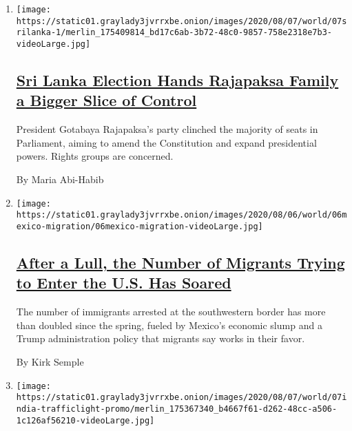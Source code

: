\begin{enumerate}
\def\labelenumi{\arabic{enumi}.}
\item
  \texttt{[image: https://static01.graylady3jvrrxbe.onion/images/2020/08/07/world/07srilanka-1/merlin\_175409814\_bd17c6ab-3b72-48c0-9857-758e2318e7b3-videoLarge.jpg]}

  \hypertarget{sri-lanka-election-hands-rajapaksa-family-a-bigger-slice-of-control}{%
  \subsection{\texorpdfstring{\href{/2020/08/06/world/asia/sri-lanka-elections-rajapaksa.html}{Sri
  Lanka Election Hands Rajapaksa Family a Bigger Slice of
  Control}}{Sri Lanka Election Hands Rajapaksa Family a Bigger Slice of Control}}\label{sri-lanka-election-hands-rajapaksa-family-a-bigger-slice-of-control}}

  President Gotabaya Rajapaksa's party clinched the majority of seats in
  Parliament, aiming to amend the Constitution and expand presidential
  powers. Rights groups are concerned.

  By Maria Abi-Habib
\item
  \texttt{[image: https://static01.graylady3jvrrxbe.onion/images/2020/08/06/world/06mexico-migration/06mexico-migration-videoLarge.jpg]}

  \hypertarget{after-a-lull-the-number-of-migrants-trying-to-enter-the-us-has-soared}{%
  \subsection{\texorpdfstring{\href{/2020/08/06/world/americas/mexico-immigration-usa.html}{After
  a Lull, the Number of Migrants Trying to Enter the U.S. Has
  Soared}}{After a Lull, the Number of Migrants Trying to Enter the U.S. Has Soared}}\label{after-a-lull-the-number-of-migrants-trying-to-enter-the-us-has-soared}}

  The number of immigrants arrested at the southwestern border has more
  than doubled since the spring, fueled by Mexico's economic slump and a
  Trump administration policy that migrants say works in their favor.

  By Kirk Semple
\item
  \texttt{[image: https://static01.graylady3jvrrxbe.onion/images/2020/08/07/world/07india-trafficlight-promo/merlin\_175367340\_b4667f61-d262-48cc-a506-1c126af56210-videoLarge.jpg]}

  \hypertarget{mumbai-put-female-figures-on-traffic-signals-some-women-are-not-impressed}{%
}
\end{enumerate}
